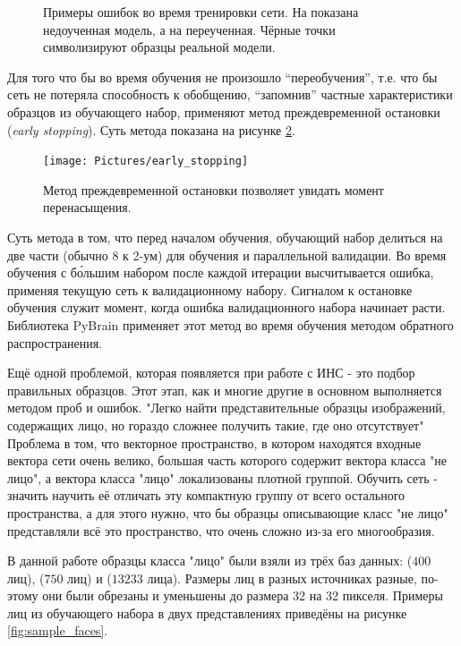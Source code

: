 \documentclass[12pt]{report}
\begin{document}
\begin{figure}[h]
	\centering
	\caption{Примеры ошибок во время тренировки сети. На  показана недоученная модель, а на 
 переученная. Чёрные точки символизируют образцы реальной модели. \citep{bradski2008learning}}
	\label{fig:under_over_fit}
\end{figure}

Для того что бы во время обучения не произошло ``переобучения'', т.е. что бы сеть не потеряла способность к 
обобщению, ``запомнив'' частные характеристики образцов из обучающего набор, применяют метод преждевременной 
остановки (\textit{early stopping}). Суть метода показана на рисунке \ref{fig:early_stop}.

\begin{figure}[h]
	\centering
	\texttt{[image: Pictures/early\_stopping]}
	\caption{Метод преждевременной остановки позволяет увидать момент перенасыщения.}
	\label{fig:early_stop}
\end{figure}

Суть метода в том, что перед началом обучения, обучающий набор делиться на две части (обычно 8 к 2-ум) для обучения и 
параллельной валидации. Во время обучения с б\'{о}льшим набором после каждой итерации высчитывается ошибка, применяя 
текущую сеть к валидационному набору. Сигналом к остановке обучения служит момент, когда ошибка валидационного набора 
начинает расти. Библиотека PyBrain применяет этот метод во время обучения методом обратного распространения.

Ещё одной проблемой, которая появляется при работе с ИНС - это подбор правильных образцов. Этот этап, как и многие 
другие в основном выполняется методом проб и ошибок. "Легко найти представительные образцы изображений, содержащих 
лицо, но гораздо сложнее получить такие, где оно отсутствует" \citep{rowley1998neural} Проблема в том, что векторное 
пространство, в котором находятся входные вектора сети очень велико, большая часть которого содержит вектора класса 
"не лицо", а вектора класса "лицо" локализованы плотной группой. Обучить сеть - значить научить её отличать эту 
компактную группу от всего остального пространства, а для этого нужно, что бы образцы описывающие класс "не лицо" 
представляли всё это пространство, что очень сложно из-за его многообразия. %

В данной работе образцы класса "лицо" были взяли из трёх баз данных: \citep{samaria1994parameterisation} ($400$ лиц), 
\citep{GeorgiaTechFaceDatabase} ($750$ лиц) и \citep{huang2007labeled} ($13 233$ лица). Размеры лиц в разных 
источниках разные, по-этому они были  обрезаны и уменьшены до размера 32 на 32 пикселя. Примеры лиц из обучающего 
набора в двух представлениях приведёны на рисунке \ref{fig:sample_faces}.
\end{document}
